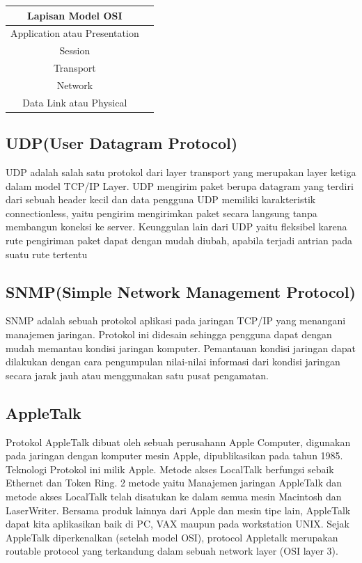 \documentclass{article}
\begin{document}
\begin{table} [h]
\begin {tabular} {|cc|}
\hline
Lapisan Model OSI & \\
\hline
Application atau Presentation & \\
\hline
Session & \\
\hline
Transport & \\
\hline
Network & \\
\hline
Data Link atau Physical & \\
\hline
\end{tabular}
\end{table} 
  
 \subsection{UDP(User Datagram Protocol)}
UDP adalah salah satu protokol dari layer transport yang merupakan layer ketiga dalam model TCP/IP Layer.
UDP mengirim paket berupa datagram yang terdiri dari sebuah header kecil dan data pengguna UDP memiliki karakteristik connectionless, 
yaitu pengirim mengirimkan paket secara langsung tanpa membangun koneksi ke server. 
Keunggulan lain dari UDP yaitu fleksibel karena rute pengiriman paket dapat dengan mudah diubah, apabila terjadi antrian pada suatu rute tertentu 
 
 \subsection{SNMP(Simple Network Management Protocol)}
SNMP adalah sebuah protokol aplikasi pada jaringan TCP/IP yang menangani manajemen jaringan. 
Protokol ini didesain sehingga pengguna dapat dengan mudah memantau kondisi jaringan komputer. 
Pemantauan kondisi jaringan dapat dilakukan dengan cara pengumpulan nilai-nilai informasi dari kondisi jaringan secara jarak jauh atau 
menggunakan satu pusat pengamatan.
  
 \subsection{AppleTalk} 
Protokol AppleTalk dibuat oleh sebuah perusahann Apple Computer, digunakan pada jaringan dengan komputer mesin Apple, dipublikasikan 
pada tahun 1985. Teknologi Protokol ini milik Apple. Metode akses LocalTalk berfungsi sebaik Ethernet dan Token Ring. 2 metode yaitu 
Manajemen jaringan AppleTalk dan metode akses LocalTalk telah disatukan ke dalam semua mesin Macintosh dan LaserWriter. Bersama produk 
lainnya dari Apple dan mesin tipe lain, AppleTalk dapat kita aplikasikan  baik di PC, VAX maupun  pada workstation UNIX. Sejak AppleTalk 
diperkenalkan (setelah model OSI), protocol Appletalk merupakan routable protocol yang terkandung dalam sebuah network layer (OSI layer 
3). 
\end{document}
